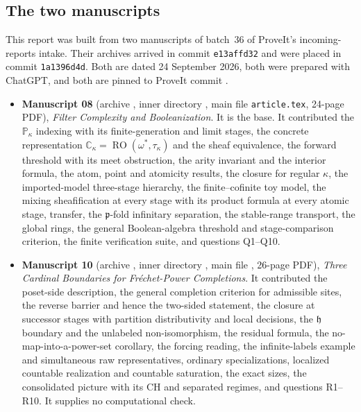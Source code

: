 \documentclass[11pt,letterpaper]{article}
\theoremstyle{definition}
\theoremstyle{remark}
\newcommand{\om}{\omega}
\newcommand{\C}{\mathbb C}
\newcommand{\PP}{\mathbb P}
\newcommand{\cp}{\mathfrak p}
\newcommand{\ch}{\mathfrak h}
\newcommand{\RO}{\operatorname{RO}}
\begin{document}
\subsection{The two manuscripts}
This report was built from two manuscripts of batch~36 of ProveIt's
incoming-reports intake. Their archives arrived in commit
\texttt{e13affd32} and were placed in commit \texttt{1a1396d4d}. Both
are dated 24 September 2026, both were prepared with ChatGPT, and both
are pinned to ProveIt commit
.
\begin{itemize}
\item \textbf{Manuscript 08} (archive
, inner directory
, main file \texttt{article.tex},
24-page PDF), \emph{Filter Complexity and Booleanization}. It is the base.
It contributed the $\PP_\kappa$ indexing with its finite-generation and
limit stages, the concrete representation $\C_\kappa=\RO(\om^*,\tau_\kappa)$
and the sheaf equivalence, the forward threshold with its meet
obstruction, the arity invariant and the interior formula, the atom,
point and atomicity results, the closure for regular $\kappa$, the
imported-model three-stage hierarchy, the finite--cofinite toy model,
the mixing sheafification at every stage with its product formula at
every atomic stage, transfer, the $\cp$-fold infinitary separation, the
stable-range transport, the global rings, the general Boolean-algebra
threshold and stage-comparison criterion, the finite verification suite,
and questions Q1--Q10.
\item \textbf{Manuscript 10} (archive
, inner directory
, main file
, 26-page PDF), \emph{Three
Cardinal Boundaries for Fr\'echet-Power Completions}. It contributed the
poset-side description, the general completion criterion for admissible
sites, the reverse barrier and hence the two-sided statement, the
closure at successor stages with partition distributivity and local
decisions, the $\ch$ boundary and the unlabeled non-isomorphism, the
residual formula, the no-map-into-a-power-set corollary, the forcing
reading, the infinite-labels example and simultaneous raw
representatives, ordinary specializations, localized countable
realization and countable saturation, the exact sizes, the consolidated
picture with its CH and separated regimes, and questions R1--R10. It
supplies no computational check.
\end{itemize}
\end{document}
